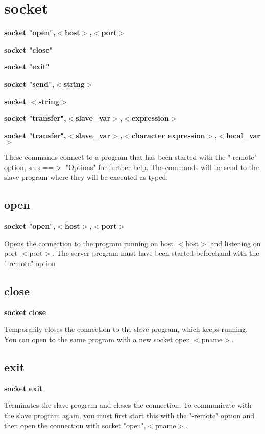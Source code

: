 \section{socket}
{\bf socket "open",$ <$host$> $,$ <$port$> $ \par }
{\bf socket "close" \par }
{\bf socket "exit" \par }
{\bf socket "send",$ <$string$> $ \par }
{\bf socket $ <$string$> $ \par }
{\bf socket "transfer",$ <$slave\_var$> $,$ <$expression$> $ \par }
{\bf socket "transfer",$ <$slave\_var$> $,$ <$character expression$> $,$ <$local\_var$> $ \par }
\par
\vspace{3pt}
These commands connect to a program that has been started with the 
"-remote" option, sees ==$> $ "Options" for further help. 
The commands will be send to the slave program where they will be 
executed as typed. 
\par
\subsection*{open}
{\bf socket "open",$ <$host$> $,$ <$port$> $ \par }
\par
\vspace{3pt}
Opens the connection to the program running on host $ <$host$> $ and 
listening on port $ <$port$> $. The server program  must have been 
started beforehand with the "-remote" option 
\subsection*{close}
{\bf socket close \par }
\par
\vspace{3pt}
Temporarily closes the connection to the slave program, which keeps 
running. You can open to the same program with a new socket open,$ <$pname$> $. 
\subsection*{exit}
{\bf socket exit \par }
\par
\vspace{3pt}
Terminates the slave program and closes the connection. To communicate 
with the slave program again, you must first start this with the 
"-remote" option and then open the connection with 
socket "open",$ <$pname$> $. 
